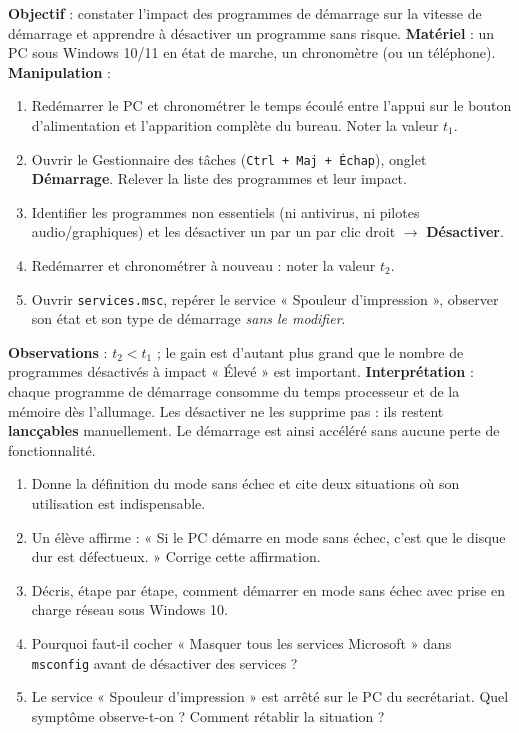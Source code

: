 \documentclass[11pt]{article}
\begin{document}
\begin{experience}
\textbf{Objectif} : constater l'impact des programmes de démarrage sur la vitesse de démarrage et apprendre à désactiver un programme sans risque.
\textbf{Matériel} : un PC sous Windows 10/11 en état de marche, un chronomètre (ou un téléphone).
\textbf{Manipulation} :
\begin{enumerate}
\item Redémarrer le PC et chronométrer le temps écoulé entre l'appui sur le bouton d'alimentation et l'apparition complète du bureau. Noter la valeur $t_1$.
\item Ouvrir le Gestionnaire des tâches (\texttt{Ctrl + Maj + Échap}), onglet \textbf{Démarrage}. Relever la liste des programmes et leur impact.
\item Identifier les programmes non essentiels (ni antivirus, ni pilotes audio/graphiques) et les désactiver un par un par clic droit $\rightarrow$ \textbf{Désactiver}.
\item Redémarrer et chronométrer à nouveau : noter la valeur $t_2$.
\item Ouvrir \texttt{services.msc}, repérer le service « Spouleur d'impression », observer son état et son type de démarrage \emph{sans le modifier}.
\end{enumerate}
\textbf{Observations} : $t_2 < t_1$ ; le gain est d'autant plus grand que le nombre de programmes désactivés à impact « Élevé » est important.
\textbf{Interprétation} : chaque programme de démarrage consomme du temps processeur et de la mémoire dès l'allumage. Les désactiver ne les supprime pas : ils restent \textbf{lanc\c{c}ables} manuellement. Le démarrage est ainsi accéléré sans aucune perte de fonctionnalité.
\end{experience}

\begin{exercice}
\begin{enumerate}
\item Donne la définition du mode sans échec et cite deux situations où son utilisation est indispensable.
\item Un élève affirme : « Si le PC démarre en mode sans échec, c'est que le disque dur est défectueux. » Corrige cette affirmation.
\item Décris, étape par étape, comment démarrer en mode sans échec avec prise en charge réseau sous Windows 10.
\item Pourquoi faut-il cocher « Masquer tous les services Microsoft » dans \texttt{msconfig} avant de désactiver des services ?
\item Le service « Spouleur d'impression » est arrêté sur le PC du secrétariat. Quel symptôme observe-t-on ? Comment rétablir la situation ?
\end{enumerate}
\end{exercice}
\end{document}
